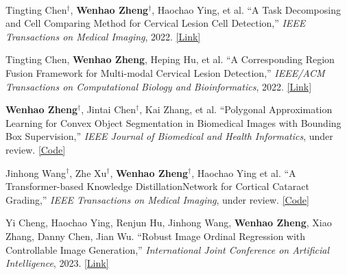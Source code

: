 
\begin{cventries}

    \cventry
    {} %
    {\ } %
    {\ } %
    {} %
    {
        \vspace{-8mm}
        \begin{cvitemize2}
            \item Tingting Chen$^\dagger$, \textbf{Wenhao Zheng$^\dagger$}, Haochao Ying, et al. ``A Task Decomposing and Cell Comparing Method for Cervical Lesion Cell Detection,'' \textit{IEEE Transactions on Medical Imaging}, 2022. \href{https://ieeexplore.ieee.org/document/9744114}{\textcolor{link}{[Link]}}
            \vspace{1mm}
            \item Tingting Chen, \textbf{Wenhao Zheng}, Heping Hu, et al. ``A Corresponding Region Fusion Framework for Multi-modal Cervical Lesion Detection,'' \textit{IEEE/ACM Transactions on Computational Biology and Bioinformatics}, 2022. \href{https://ieeexplore.ieee.org/document/9784879}{\textcolor{link}{[Link]}}
            \vspace{1mm}
            \item \textbf{Wenhao Zheng$^\dagger$}, Jintai Chen$^\dagger$, Kai Zhang, et al. ``Polygonal Approximation Learning for Convex Object Segmentation in Biomedical Images with Bounding Box Supervision,'' \textit{IEEE Journal of Biomedical and Health Informatics}, under review. \href{https://github.com/shenmishajing/PAL}{\textcolor{link}{[Code]}}
            \item Jinhong Wang$^\dagger$, Zhe Xu$^\dagger$, \textbf{Wenhao Zheng$^\dagger$}, Haochao Ying et al. ``A Transformer-based Knowledge DistillationNetwork for Cortical Cataract Grading,'' \textit{IEEE Transactions on Medical Imaging}, under review. \href{https://github.com/shenmishajing/aux_cervix_detection}{\textcolor{link}{[Code]}}
            \vspace{1mm}
            \item Yi Cheng, Haochao Ying, Renjun Hu, Jinhong Wang, \textbf{Wenhao Zheng}, Xiao Zhang, Danny Chen, Jian Wu. ``Robust Image Ordinal Regression with Controllable Image Generation,'' \textit{International Joint Conference on Artificial Intelligence}, 2023. \href{https://arxiv.org/abs/2305.04213}{\textcolor{link}{[Link]}}
            \vspace{1mm}

\end{cvitemize2}}
\end{cventries}
